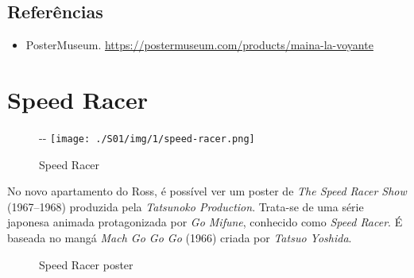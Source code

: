 \hypertarget{referuxeancias-3}{%
\subsection{Referências}\label{referuxeancias-3}}

\begin{itemize}
\tightlist
\item
  \sloppy PosterMuseum. \url{https://postermuseum.com/products/maina-la-voyante}
\end{itemize}

\hypertarget{speed-racer}{%
\section{Speed Racer}\label{speed-racer}}

\begin{figure}[!ht]
  \begin{adjustwidth}{-\oddsidemargin-1in}{-\rightmargin}
    \centering
    \texttt{[image: ./S01/img/1/speed-racer.png]}
    \caption{Speed Racer\label{fig:speed-racer}}
  \end{adjustwidth}
\end{figure}

\saveparinfos
\noindent
\begin{minipage}[c]{0.5\textwidth}\useparinfo

No novo apartamento do Ross, é possível ver um poster de \emph{The Speed
Racer Show} (1967--1968) produzida pela \emph{Tatsunoko Production}.
Trata-se de uma série japonesa animada protagonizada por \emph{Go
Mifune}, conhecido como \emph{Speed Racer}. É baseada no mangá
\emph{Mach Go Go Go} (1966) criada por \emph{Tatsuo Yoshida}.

\end{minipage}\hfill
\begin{minipage}[c]{0.5\textwidth}

\begin{figure}
  \centering
    \caption{Speed Racer poster\label{fig:speed-racer-poster}}
\end{figure}

\end{minipage}

